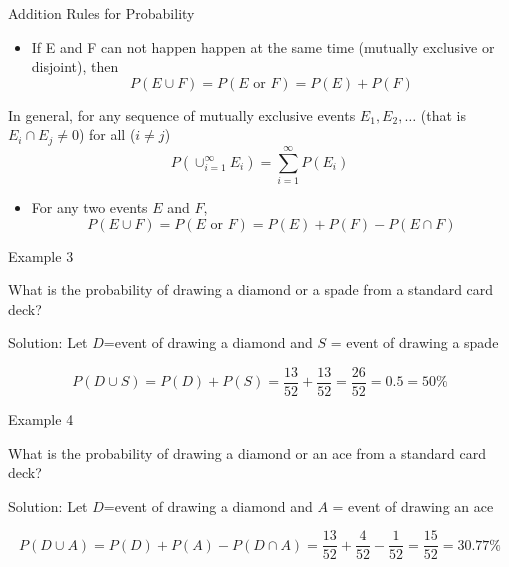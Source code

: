 \documentclass[
  ignorenonframetext,
]{beamer}
\providecommand{\tightlist}{%
  \setlength{\itemsep}{0pt}\setlength{\parskip}{0pt}}
\begin{document}
\begin{frame}{Addition Rules for Probability}
\protect\hypertarget{addition-rules-for-probability}{}
\begin{itemize}
\tightlist
\item
  If E and F can not happen happen at the same time (mutually exclusive
  or disjoint), then \[P(E \cup F)=P(E \text{ or } F)=P(E)+ P(F)\]
\end{itemize}

In general, for any sequence of mutually exclusive events
\(E_1, E_2, \ldots\) (that is \(E_i \cap E_j \neq 0\)) for all
(\(i\neq j\))
\[P\left(\cup_{i=1}^{\infty} E_i\right)=\sum_{i=1}^{\infty} P(E_i)\]

\begin{itemize}
\tightlist
\item
  For any two events \(E\) and \(F\),
  \[P(E \cup F)=P(E \text{ or } F)=P(E)+ P(F)-P(E\cap F)\]
\end{itemize}
\end{frame}

\begin{frame}{Example 3}
\protect\hypertarget{example-3}{}
\begin{tcolorbox}
What is the probability of drawing a diamond or a spade from a standard card deck?
\end{tcolorbox}

\begin{tcolorbox}
Solution:
Let $D$=event of drawing a diamond and $S$ = event of drawing a spade 

$$P(D\cup S)=P(D)+P(S) =\frac{13}{52} + \frac{13}{52} = \frac{26}{52} = 0.5 = 50\%$$
\end{tcolorbox}
\end{frame}

\begin{frame}{Example 4}
\protect\hypertarget{example-4}{}
\begin{tcolorbox}
What is the probability of drawing a diamond or an ace from a standard card deck?
\end{tcolorbox}

\begin{tcolorbox}
Solution:
Let $D$=event of drawing a diamond and $A$ = event of drawing an ace

$$P(D\cup A)=P(D)+P(A)-P(D\cap A) = \frac{13}{52} + \frac{4}{52}-\frac{1}{52} = \frac{15}{52} = 30.77\%$$
\end{tcolorbox}
\end{frame}
\end{document}
